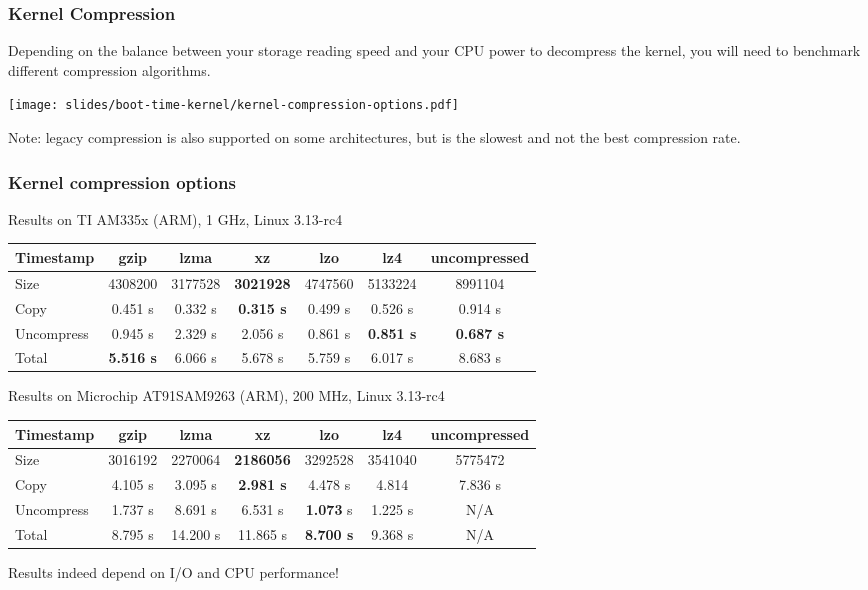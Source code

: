 \begin{frame}
\frametitle{Kernel Compression}
Depending on the balance between your storage reading speed and your
CPU power to decompress the kernel, you will need to benchmark
different compression algorithms.
\begin{center}
    \texttt{[image: slides/boot-time-kernel/kernel-compression-options.pdf]}
\end{center}
Note:  legacy compression is also supported on some architectures,
but is the slowest and not the best compression rate.
\end{frame}

\begin{frame}
\frametitle{Kernel compression options}
Results on TI AM335x (ARM), 1 GHz, Linux 3.13-rc4
{\fontsize{7}{10}\selectfont
\begin{tabular}{| l || c | c | c | c | c | c |}
\hline
Timestamp & gzip & lzma & xz & lzo & lz4 & uncompressed \\
\hline
Size & 4308200 & 3177528 & {\bf 3021928} & 4747560 & 5133224 & 8991104 \\
Copy & 0.451 s & 0.332 s & {\bf 0.315 s} & 0.499 s & 0.526 s & 0.914 s \\
Uncompress & 0.945 s & 2.329 s & 2.056 s & 0.861 s & {\bf 0.851 s} & {\bf 0.687 s} \\
Total & {\bf 5.516 s} & 6.066 s & 5.678 s & 5.759 s & 6.017 s & 8.683 s \\
\hline
\end{tabular}
}
\vfill{}
Results on Microchip AT91SAM9263 (ARM), 200 MHz, Linux 3.13-rc4
{\fontsize{7}{10}\selectfont
\begin{tabular}{| l || c | c | c | c | c | c |}
\hline
Timestamp & gzip & lzma & xz & lzo & lz4 & uncompressed \\
\hline
Size & 3016192 & 2270064 & {\bf 2186056} & 3292528 & 3541040 & 5775472 \\
Copy & 4.105 s & 3.095 s & {\bf 2.981 s} & 4.478 s & 4.814 & 7.836 s \\
Uncompress & 1.737 s & 8.691 s & 6.531 s & {\bf 1.073} s & 1.225 s & N/A \\
Total & 8.795 s & 14.200 s & 11.865 s & {\bf 8.700 s} & 9.368 s & N/A \\
\hline
\end{tabular}
}
\newline\newline
Results indeed depend on I/O and CPU performance!
\end{frame}

